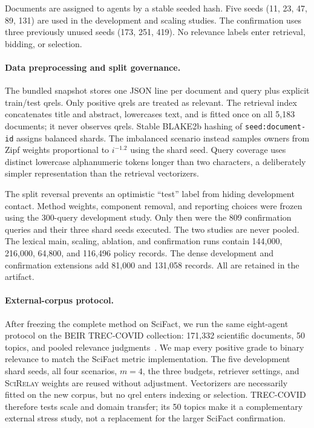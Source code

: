 \documentclass[sigconf]{acmart}
\newcommand{\method}{\textsc{SciRelay}}
\begin{document}
Documents are assigned to agents by a stable seeded hash. Five seeds (11, 23, 47, 89, 131) are used in the development and scaling studies. The confirmation uses three previously unused seeds (173, 251, 419). No relevance labels enter retrieval, bidding, or selection.

\paragraph{Data preprocessing and split governance.}
The bundled snapshot stores one JSON line per document and query plus explicit train/test qrels. Only positive qrels are treated as relevant. The retrieval index concatenates title and abstract, lowercases text, and is fitted once on all 5,183 documents; it never observes qrels. Stable BLAKE2b hashing of \texttt{seed:document-id} assigns balanced shards. The imbalanced scenario instead samples owners from Zipf weights proportional to $i^{-1.2}$ using the shard seed. Query coverage uses distinct lowercase alphanumeric tokens longer than two characters, a deliberately simpler representation than the retrieval vectorizers.

The split reversal prevents an optimistic ``test'' label from hiding development contact. Method weights, component removal, and reporting choices were frozen using the 300-query development study. Only then were the 809 confirmation queries and their three shard seeds executed. The two studies are never pooled. The lexical main, scaling, ablation, and confirmation runs contain 144,000, 216,000, 64,800, and 116,496 policy records. The dense development and confirmation extensions add 81,000 and 131,058 records. All are retained in the artifact.

\paragraph{External-corpus protocol.}
After freezing the complete method on SciFact, we run the same eight-agent protocol on the BEIR TREC-COVID collection: 171,332 scientific documents, 50 topics, and pooled relevance judgments~\cite{voorhees2020treccovid,thakur2021beir}. We map every positive grade to binary relevance to match the SciFact metric implementation. The five development shard seeds, all four scenarios, $m=4$, the three budgets, retriever settings, and \method{} weights are reused without adjustment. Vectorizers are necessarily fitted on the new corpus, but no qrel enters indexing or selection. TREC-COVID therefore tests scale and domain transfer; its 50 topics make it a complementary external stress study, not a replacement for the larger SciFact confirmation.
\end{document}
